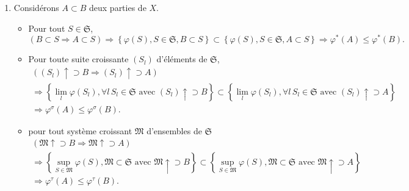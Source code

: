 \begin{demo}
\begin{enumerate}
  \item Considérons $A \subset B$ deux parties de $X$.
  \begin{itemize}
   \item Pour tout $S \in \mathfrak{S}$,
\begin{displaymath}
 \left( B \subset S \Rightarrow A \subset S \right)
   \Rightarrow
   \left\lbrace \varphi(S), S \in \mathfrak{S}, B \subset S\right\rbrace \subset \left\lbrace \varphi(S), S \in \mathfrak{S}, A \subset S\right\rbrace
   \Rightarrow
   \varphi^*(A) \leq \varphi^*(B).
\end{displaymath}
    \item Pour toute suite croissante $(S_l)$ d'éléments de $\mathfrak{S}$,
\begin{multline*}
 \left( (S_l)\uparrow \supset B \Rightarrow (S_l) \uparrow \supset A \right) \\
   \Rightarrow
   \left\lbrace \lim_l\varphi(S_l), \forall l\, S_l \in \mathfrak{S} \text{ avec } (S_l)\uparrow \supset B\right\rbrace
     \subset
  \left\lbrace \lim_l\varphi(S_l), \forall l\, S_l \in \mathfrak{S} \text{ avec } (S_l)\uparrow \supset A\right\rbrace \\
   \Rightarrow
   \varphi^\sigma(A) \leq \varphi^\sigma(B).
\end{multline*}
    \item pour tout système croissant $\mathfrak{M}$ d'ensembles de $\mathfrak{S}$
\begin{multline*}
 \left( \mathfrak{M}\uparrow \supset B \Rightarrow \mathfrak{M} \uparrow \supset A \right) \\
   \Rightarrow
   \left\lbrace \sup_{S \in \mathfrak{M}}\varphi(S), \mathfrak{M} \subset \mathfrak{S} \text{ avec } \mathfrak{M}\uparrow \supset B\right\rbrace
     \subset
  \left\lbrace \sup_{S \in \mathfrak{M}}\varphi(S), \mathfrak{M} \subset \mathfrak{S} \text{ avec } \mathfrak{M}\uparrow \supset A\right\rbrace \\
   \Rightarrow
   \varphi^\tau(A) \leq \varphi^\tau(B).
\end{multline*}

\end{itemize}

 \end{enumerate}
\end{demo}


